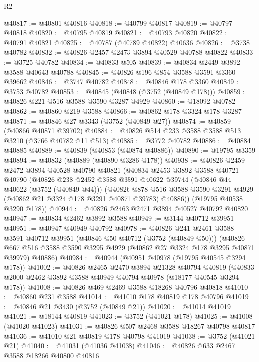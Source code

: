 \begin{lexlean}{R2}
\begin{coremodule}
@40817 := @40801 @40816
@40818 := @40799 @40817
@40819 := @40797 @40818
@40820 := @40795 @40819
@40821 := @40793 @40820
@40822 := @40791 @40821
@40825 := @40787 (@40789 @40822) @40636
@40826 := @3738 @40782
@40832 := @40826 @2457 @2473 @3894 @40529 @40788 @40822
@40833 := @3725 @40782
@40834 := @40833 @505
@40839 := @40834 @2449 @3892 @3588 @40643 @40788
@40845 := @40826 @196 @854 @3588 @3591 @3360 @39662
@40846 := @3747 @40782
@40848 := @40846 @178 @3360
@40849 := @3753 @40782
@40853 := @40845 (@40848 (@3752 (@40849 @178)))
@40859 := @40826 @221 @516 @3588 @3590 @3287 @4929
@40860 := @18092 @40782
@40862 := @40860 @219 @3588
@40866 := @40862 @178 @3324 @178 @3287
@40871 := @40846 @27 @3343 (@3752 (@40849 @27))
@40874 := @40859 (@40866 @40871 @39702)
@40884 := @40826 @514 @233 @3588 @3588 @513 @3210 (@3766 @40782 @11 @513)
@40885 := @3772 @40782
@40886 := @40884 @40885
@40889 := @40839 (@40853 (@40874 @40886))
@40890 := @19795 @3359
@40894 := @40832 (@40889 (@40890 @3286 @178))
@40938 := @40826
    @2459
    @2472
    @3894
    @40528
    @40790
    @40821
    (@40834
      @2453
      @3892
      @3588
      @40721
      @40790
      (@40826
        @238
        @2452
        @3588
        @3591
        @40622
        @39744
        (@40846 @44 @40622 (@3752 (@40849 @44)))
        (@40826
          @878
          @516
          @3588
          @3590
          @3291
          @4929
          (@40862 @21 @3324 @178 @3291 @40871 @39783)
          @40886))
      (@19795 @40538 @3290 @178))
@40944 := @40826 @2463 @2471 @3894 @40527 @40792 @40820
@40947 := @40834 @2462 @3892 @3588
@40949 := @3144 @40712 @39951
@40951 := @40947 @40949 @40792
@40978 := @40826
    @241
    @2461
    @3588
    @3591
    @40712
    @39951
    (@40846 @50 @40712 (@3752 (@40849 @50)))
    (@40826 @667 @516 @3588 @3590 @3295 @4929 (@40862 @27 @3324 @178 @3295 @40871 @39979) @40886)
@40984 := @40944 (@40951 @40978 (@19795 @40545 @3294 @178))
@41002 := @40826
    @2465
    @2470
    @3894
    @21328
    @40794
    @40819
    (@40833 @2000 @2462 @3892 @3588 @40949 @40794 @40978 (@18177 @40545 @3294 @178))
@41008 := @40826 @469 @2469 @3588 @18268 @40796 @40818
@41010 := @40860 @231 @3588
@41014 := @41010 @178 @40819 @178 @40796
@41019 := @40846 @21 @3430 (@3752 (@40849 @21))
@41020 := @41014 @41019
@41021 := @18144 @40819
@41023 := @3752 (@41021 @178)
@41025 := @41008 (@41020 @41023)
@41031 := @40826 @507 @2468 @3588 @18267 @40798 @40817
@41036 := @41010 @21 @40819 @178 @40798 @41019
@41038 := @3752 (@41021 @21)
@41040 := @41031 (@41036 @41038)
@41046 := @40826 @633 @2467 @3588 @18266 @40800 @40816

\end{coremodule}
\end{lexlean}
